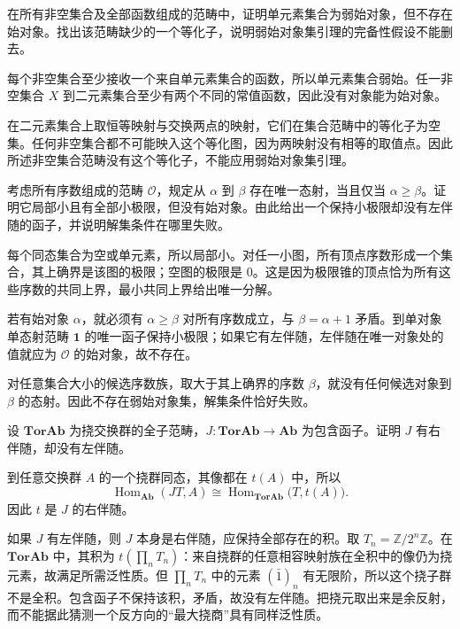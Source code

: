 \begin{exercise}\label{b4:ex:A-nonempty-sets-initial}
	在所有非空集合及全部函数组成的范畴中，证明单元素集合为弱始对象，但不存在始对象。找出该范畴缺少的一个等化子，说明弱始对象集引理的完备性假设不能删去。
\end{exercise}
\begin{solution}
	每个非空集合至少接收一个来自单元素集合的函数，所以单元素集合弱始。任一非空集合 \(X\) 到二元素集合至少有两个不同的常值函数，因此没有对象能为始对象。

	在二元素集合上取恒等映射与交换两点的映射，它们在集合范畴中的等化子为空集。任何非空集合都不可能映入这个等化图，因为两映射没有相等的取值点。因此所述非空集合范畴没有这个等化子，不能应用弱始对象集引理。
\end{solution}

\begin{optionalexercise}\label{b4:ex:A-ordinal-solution-set}
	考虑所有序数组成的范畴 \(\mathcal O\)，规定从 \(\alpha\) 到 \(\beta\) 存在唯一态射，当且仅当 \(\alpha\ge\beta\)。证明它局部小且有全部小极限，但没有始对象。由此给出一个保持小极限却没有左伴随的函子，并说明解集条件在哪里失败。
\end{optionalexercise}
\begin{solution}
	每个同态集合为空或单元素，所以局部小。对任一小图，所有顶点序数形成一个集合，其上确界是该图的极限；空图的极限是 \(0\)。这是因为极限锥的顶点恰为所有这些序数的共同上界，最小共同上界给出唯一分解。

	若有始对象 \(\alpha\)，就必须有 \(\alpha\ge\beta\) 对所有序数成立，与 \(\beta=\alpha+1\) 矛盾。到单对象单态射范畴 \(\mathbf1\) 的唯一函子保持小极限；如果它有左伴随，左伴随在唯一对象处的值就应为 \(\mathcal O\) 的始对象，故不存在。

	对任意集合大小的候选序数族，取大于其上确界的序数 \(\beta\)，就没有任何候选对象到 \(\beta\) 的态射。因此不存在弱始对象集，解集条件恰好失败。
\end{solution}

\begin{exercise}\label{b4:ex:A-torsion-inclusion}
	设 \(\mathbf{TorAb}\) 为挠交换群的全子范畴，\(J:\mathbf{TorAb}\to\mathbf{Ab}\) 为包含函子。证明 \(J\) 有右伴随，却没有左伴随。
\end{exercise}
\begin{solution}
	到任意交换群 \(A\) 的一个挠群同态，其像都在 \(t(A)\) 中，所以
	\[
		\operatorname{Hom}_{\mathbf{Ab}}(JT,A) \cong\operatorname{Hom}_{\mathbf{TorAb}}\bigl(T,t(A)\bigr).
	\]
	因此 \(t\) 是 \(J\) 的右伴随。

	如果 \(J\) 有左伴随，则 \(J\) 本身是右伴随，应保持全部存在的积。取 \(T_n=\mathbb Z/2^n\mathbb Z\)。在 \(\mathbf{TorAb}\) 中，其积为 \(t(\prod_nT_n)\)：来自挠群的任意相容映射族在全积中的像仍为挠元素，故满足所需泛性质。但 \(\prod_nT_n\) 中的元素 \((\bar1)_n\) 有无限阶，所以这个挠子群不是全积。包含函子不保持该积，矛盾，故没有左伴随。把挠元取出来是余反射，而不能据此猜测一个反方向的“最大挠商”具有同样泛性质。
\end{solution}

